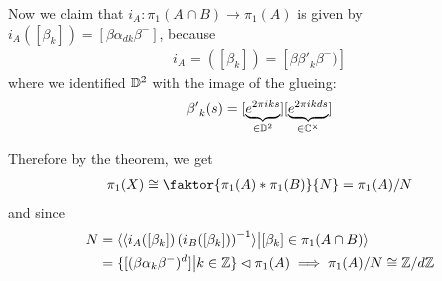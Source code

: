 \begin{ex}
  Now we claim that $i_A: \pi_1(A \cap B) \to \pi_1(A)$ is given by $i_A([\beta_k]) = [\beta \alpha_{dk}\beta^{-}]$, because
  \begin{align*}
    i_A = ([\beta_k]) = [\beta {\beta'}_k \beta^{-})]
  \end{align*}
  where we identified $\mathbb{D}^{2}$ with the image of the glueing:
  \begin{align*}
    {\beta'}_k(s) = [\underbrace{e^{2 \pi i k s}}_{\in \mathbb{D}^{2}}] [\underbrace{e^{2 \pi i k d s}}_{\in \mathbb{C}^{\times}}]
  \end{align*}

  Therefore by the theorem, we get
  \begin{align*}
    \pi_1(X) \iso \faktor{\pi_1(A) \ast \pi_1(B)}{N} = \pi_1(A)/N
  \end{align*}
  and since
  \begin{align*}
    N 
    &= 
    \langle\langle i_A([\beta_k]) \left(
          i_B([\beta_k])
    \right)^{-1}\rangle \big\vert [\beta_k] \in \pi_1(A \cap B) \rangle\\
    &=\{[(\beta \alpha_k \beta^{-})^{d}] \big\vert k \in \mathbb{Z}\} \lhd \pi_1(A) \implies \pi_1(A)/N \cong \mathbb{Z}/d\mathbb{Z}
  \end{align*}
\end{ex}

